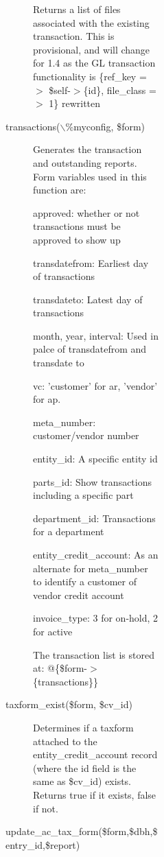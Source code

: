\begin{description}
\begin{description}
\begin{description}
\begin{description}
\begin{description}
\begin{description}
\begin{description}
\begin{description}
Returns a list of files associated with the existing transaction.  This is 
provisional, and will change for 1.4 as the GL transaction functionality is 
                  \{ref\_key =$>$ \$self-$>$\{id\}, file\_class =$>$ 1\}
rewritten


\item[{transactions($\backslash$\%myconfig, \$form)}] \mbox{}

Generates the transaction and outstanding reports.  Form variables used in this
function are:



approved: whether or not transactions must be approved to show up



transdatefrom: Earliest day of transactions



transdateto:  Latest day of transactions



month, year, interval:  Used in palce of transdatefrom and transdate to



vc:  'customer' for ar, 'vendor' for ap.



meta\_number:  customer/vendor number



entity\_id:  A specific entity id



parts\_id:  Show transactions including a specific part



department\_id:  Transactions for a department



entity\_credit\_account: As an alternate for meta\_number to identify a customer
of vendor credit account



invoice\_type:  3 for on-hold, 2 for active



The transaction list is stored at:
@\{\$form-$>$\{transactions\}\}


\item[{taxform\_exist(\$form, \$cv\_id)}] \mbox{}

Determines if a taxform attached to the entity\_credit\_account record (where
the id field is the same as \$cv\_id) exists. Returns true if it exists, false
if not.


\item[{update\_ac\_tax\_form(\$form,\$dbh,\$entry\_id,\$report)}] \mbox{}


\end{description}
\end{description}
\end{description}
\end{description}
\end{description}
\end{description}
\end{description}
\end{description}
